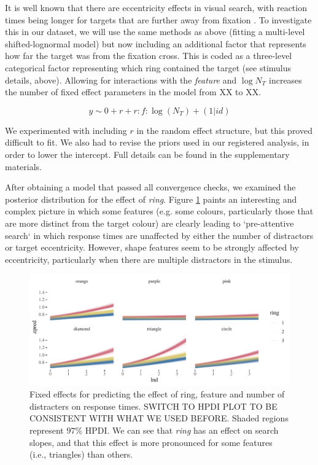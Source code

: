 \documentclass[preprint,12pt,authoryear]{elsarticle}
\begin{document}
It is well known that there are eccentricity effects in visual search, with reaction times being longer for targets that are further away from fixation \citep{carrasco1995eccentricity}. To investigate this in our dataset, we will use the same methods as above (fitting a multi-level shifted-lognormal model) but now including an additional factor that represents how far the target was from the fixation cross. This is coded as a three-level categorical factor representing which ring contained the target (see stimulus details, above). Allowing for interactions with the \textit{feature} and $\log{N_T}$ increases the number of fixed effect parameters in the model from XX to XX. 

\begin{equation}
y \sim 0 + r + r:f:\log(N_T) + (1|id)
\end{equation}

We experimented with including $r$ in the random effect structure, but this proved difficult to fit. We also had to revise the priors used in our registered analysis, in order to lower the intercept. Full details can be found in the supplementary materials. 

After obtaining a model that passed all convergence checks, we examined the posterior distribution for the effect of \textit{ring}. Figure \ref{fig:ring1} paints an interesting and complex picture in which some features (e.g. some colours, particularly those that are more distinct from the target colour) are clearly leading to `pre-attentive search` in which response times are unaffected by either the number of distractors or target eccentricity. However, shape features seem to be strongly affected by eccentricity, particularly when there are multiple distractors in the stimulus.

\begin{figure}[ht]
\centering
\includegraphics[width=\textwidth]{../plots/ring_single_feature.pdf}
\caption{Fixed effects for predicting the effect of ring, feature and number of distracters on response times. SWITCH TO HPDI PLOT TO BE CONSISTENT WITH WHAT WE USED BEFORE. Shaded regions represent $97\%$ HPDI. We can see that \textit{ring} has an effect on search slopes, and that this effect is more pronounced for some features (i.e., triangles) than others.}
\label{fig:ring1}
\end{figure}
\end{document}
